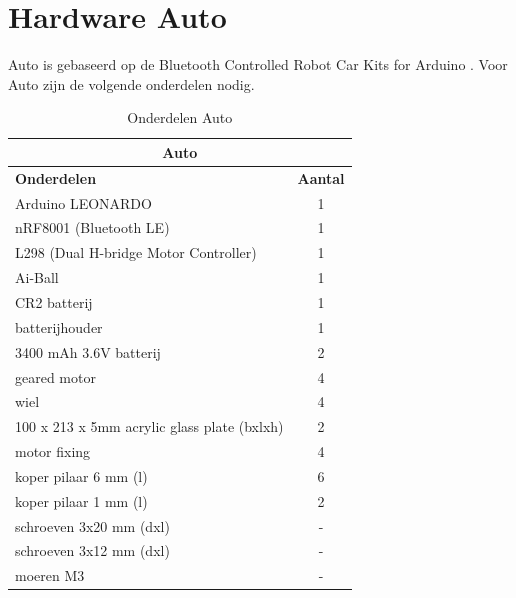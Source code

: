 \documentclass[12pt,a4paper]{article}
\begin{document}
\newpage
\section{Hardware Auto}
Auto is gebaseerd op de Bluetooth Controlled Robot Car Kits for Arduino \cite{DIY_auto}. Voor Auto zijn de volgende onderdelen nodig. 
\begin{table}[!h]	
	\begin{tabular}{|l|c|}
		\hline \multicolumn{2}{|c|}{\textbf{Auto}}	\\	
		\hline \textbf{Onderdelen} & \textbf{Aantal} \\ 
		\hline Arduino LEONARDO & 1 \\ 
		\hline  nRF8001 (Bluetooth LE) & 1  \\ 
		\hline	L298 (Dual H-bridge Motor Controller) & 1 \\
		\hline Ai-Ball & 1 \\
		\hline  CR2 batterij & 1 \\
		\hline  batterijhouder & 1  \\ 
		\hline 3400 mAh 3.6V batterij & 2 \\ 
		\hline  geared motor & 4 \\
		\hline  wiel	 & 4 \\
		\hline 	100 x 213 x 5mm acrylic glass plate (bxlxh) & 2 \\
		\hline  motor fixing & 4 \\
		\hline	koper pilaar 6 mm (l) & 6 \\
		\hline 	koper pilaar 1 mm (l) & 2 \\
		\hline 	schroeven 3x20 mm (dxl) & - \\
		\hline	schroeven 3x12 mm (dxl) & - \\
		\hline  moeren M3 & - \\	
		\hline
		\end{tabular} 
		\caption{Onderdelen Auto}
		\label{tbl:Onderdelen_auto}
	\end{table}
	
\end{document}

